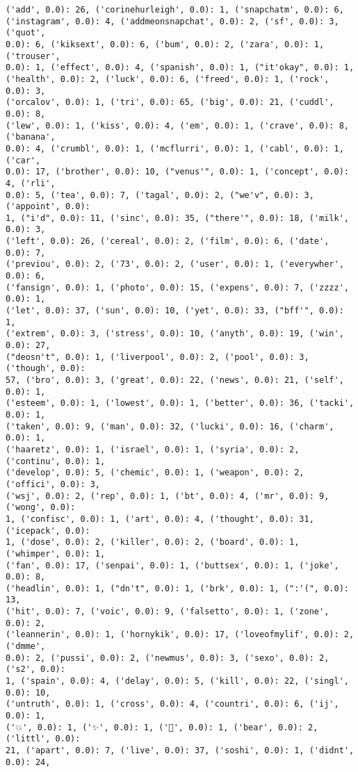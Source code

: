 \documentclass[11pt]{article}
\begin{document}
\begin{Verbatim}[commandchars=\\\{\}]
('add', 0.0): 26, ('corinehurleigh', 0.0): 1, ('snapchatm', 0.0): 6,
('instagram', 0.0): 4, ('addmeonsnapchat', 0.0): 2, ('sf', 0.0): 3, ('quot',
0.0): 6, ('kiksext', 0.0): 6, ('bum', 0.0): 2, ('zara', 0.0): 1, ('trouser',
0.0): 1, ('effect', 0.0): 4, ('spanish', 0.0): 1, ("it'okay", 0.0): 1,
('health', 0.0): 2, ('luck', 0.0): 6, ('freed', 0.0): 1, ('rock', 0.0): 3,
('orcalov', 0.0): 1, ('tri', 0.0): 65, ('big', 0.0): 21, ('cuddl', 0.0): 8,
('lew', 0.0): 1, ('kiss', 0.0): 4, ('em', 0.0): 1, ('crave', 0.0): 8, ('banana',
0.0): 4, ('crumbl', 0.0): 1, ('mcflurri', 0.0): 1, ('cabl', 0.0): 1, ('car',
0.0): 17, ('brother', 0.0): 10, ("venus'", 0.0): 1, ('concept', 0.0): 4, ('rli',
0.0): 5, ('tea', 0.0): 7, ('tagal', 0.0): 2, ("we'v", 0.0): 3, ('appoint', 0.0):
1, ("i'd", 0.0): 11, ('sinc', 0.0): 35, ("there'", 0.0): 18, ('milk', 0.0): 3,
('left', 0.0): 26, ('cereal', 0.0): 2, ('film', 0.0): 6, ('date', 0.0): 7,
('previou', 0.0): 2, ('73', 0.0): 2, ('user', 0.0): 1, ('everywher', 0.0): 6,
('fansign', 0.0): 1, ('photo', 0.0): 15, ('expens', 0.0): 7, ('zzzz', 0.0): 1,
('let', 0.0): 37, ('sun', 0.0): 10, ('yet', 0.0): 33, ("bff'", 0.0): 1,
('extrem', 0.0): 3, ('stress', 0.0): 10, ('anyth', 0.0): 19, ('win', 0.0): 27,
("deosn't", 0.0): 1, ('liverpool', 0.0): 2, ('pool', 0.0): 3, ('though', 0.0):
57, ('bro', 0.0): 3, ('great', 0.0): 22, ('news', 0.0): 21, ('self', 0.0): 1,
('esteem', 0.0): 1, ('lowest', 0.0): 1, ('better', 0.0): 36, ('tacki', 0.0): 1,
('taken', 0.0): 9, ('man', 0.0): 32, ('lucki', 0.0): 16, ('charm', 0.0): 1,
('haaretz', 0.0): 1, ('israel', 0.0): 1, ('syria', 0.0): 2, ('continu', 0.0): 1,
('develop', 0.0): 5, ('chemic', 0.0): 1, ('weapon', 0.0): 2, ('offici', 0.0): 3,
('wsj', 0.0): 2, ('rep', 0.0): 1, ('bt', 0.0): 4, ('mr', 0.0): 9, ('wong', 0.0):
1, ('confisc', 0.0): 1, ('art', 0.0): 4, ('thought', 0.0): 31, ('icepack', 0.0):
1, ('dose', 0.0): 2, ('killer', 0.0): 2, ('board', 0.0): 1, ('whimper', 0.0): 1,
('fan', 0.0): 17, ('senpai', 0.0): 1, ('buttsex', 0.0): 1, ('joke', 0.0): 8,
('headlin', 0.0): 1, ("dn't", 0.0): 1, ('brk', 0.0): 1, (":'(", 0.0): 13,
('hit', 0.0): 7, ('voic', 0.0): 9, ('falsetto', 0.0): 1, ('zone', 0.0): 2,
('leannerin', 0.0): 1, ('hornykik', 0.0): 17, ('loveofmylif', 0.0): 2, ('dmme',
0.0): 2, ('pussi', 0.0): 2, ('newmus', 0.0): 3, ('sexo', 0.0): 2, ('s2', 0.0):
1, ('spain', 0.0): 4, ('delay', 0.0): 5, ('kill', 0.0): 22, ('singl', 0.0): 10,
('untruth', 0.0): 1, ('cross', 0.0): 4, ('countri', 0.0): 6, ('ij', 0.0): 1,
('💥', 0.0): 1, ('✨', 0.0): 1, ('💫', 0.0): 1, ('bear', 0.0): 2, ('littl', 0.0):
21, ('apart', 0.0): 7, ('live', 0.0): 37, ('soshi', 0.0): 1, ('didnt', 0.0): 24,

\end{Verbatim}
\end{document}

